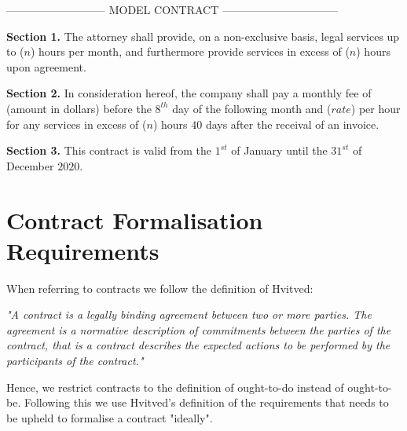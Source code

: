 \documentclass{ituthesis}
\begin{document}
--------------------------- MODEL CONTRACT --------------------------------

\begin{tcolorbox}
\textbf{Section 1.} The attorney shall provide, on a non-exclusive basis, legal services up to ($n$) hours per month, and furthermore provide services in excess of ($n$) hours upon agreement.\par
\textbf{Section 2.} In consideration hereof, the company shall pay a monthly fee of (amount in dollars) before the $8^{th}$ day of the following month and ($rate$) per hour for any services in excess of ($n$) hours 40 days after the receival of an invoice.\par
\textbf{Section 3.} This contract is valid from the $1^{st}$ of January until the $31^{st}$ of December $2020$.
\end{tcolorbox}

\section{Contract Formalisation Requirements}
When referring to contracts we follow the definition of Hvitved:
\begin{displayquote}
\textit{"A contract is a legally binding agreement between two or more
parties. The agreement is a normative description of commitments between the parties of the contract, that is a contract describes the expected actions to be performed by the participants of the contract."}
\cite{hvitved2011contract}
\end{displayquote}

Hence, we restrict contracts to the definition of ought-to-do instead of ought-to-be. Following this we use Hvitved's definition of the requirements that needs to be upheld to formalise a contract "ideally".
\end{document}

